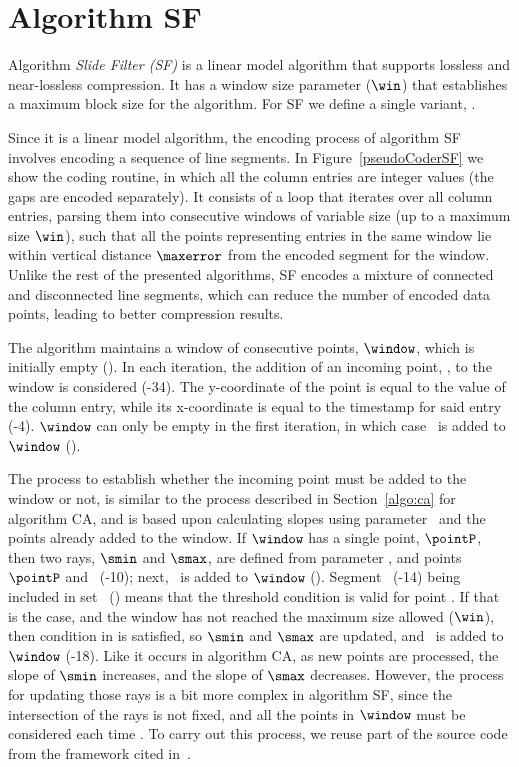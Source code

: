 
\clearpage

\section{Algorithm SF}
\label{algo:sf}

Algorithm \textit{Slide Filter (SF)} \cite{coder:sf} is a linear model algorithm that supports lossless and near-lossless compression. It has a window size parameter ($\win$) that establishes a maximum block size for the algorithm. For SF we define a single variant, \maskalgo.


Since it is a linear model algorithm, the encoding process of algorithm SF involves encoding a sequence of line segments. In Figure~\ref{pseudoCoderSF} we show the coding routine, in which all the column entries are integer values (the gaps are encoded separately). It consists of a loop that iterates over all column entries, parsing them into consecutive windows of variable size (up to a maximum size $\win$), such that all the points representing entries in the same window lie within vertical distance $\maxerror$ from the encoded segment for the window. Unlike the rest of the presented algorithms, SF encodes a mixture of connected and disconnected line segments, which can reduce the number of encoded data points, leading to better compression results.



The algorithm maintains a window of consecutive points, $\window$, which is initially empty (). In each iteration, the addition of an incoming point, \point, to the window is considered (-34). The y-coordinate of the point is equal to the value of the column entry, while its x-coordinate is equal to the timestamp for said entry (-4). $\window$ can only be empty in the first iteration, in which case \point\ is added to $\window$ (). 


The process to establish whether the incoming point must be added to the window or not, is similar to the process described in Section~\ref{algo:ca} for algorithm CA, and is based upon calculating slopes using parameter \maxerror\ and the points already added to the window. If $\window$ has a single point, $\pointP$, then two rays, $\smin$ and $\smax$, are defined from parameter \maxerror, and points $\pointP$ and \point\ (-10); next, \point\ is added to $\window$ (). Segment \EseE\ (-14) being included in set \segmentSet\ () means that the threshold condition is valid for point \point. If that is the case, and the window has not reached the maximum size allowed ($\win$), then condition in  is satisfied, so $\smin$ and $\smax$ are updated, and \point\ is added to $\window$ (-18). Like it occurs in algorithm CA, as new points are processed, the slope of $\smin$ increases, and the slope of $\smax$ decreases. However, the process for updating those rays is a bit more complex in algorithm SF, since the intersection of the rays is not fixed, and all the points in $\window$ must be considered each time \cite{coder:sf}. To carry out this process, we reuse part of the source code from the framework cited in~\cite{AnEva2013}.



